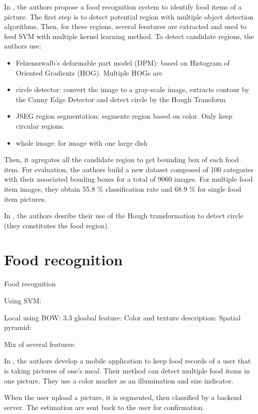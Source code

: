In \cite{Matsuda2012a}, the authors propose a food recognition system to identify food items of a picture. The first step is to detect potential region with multiple object detection algorithms. Then, for these regions, several feeatures are extracted and used to feed SVM with multiple kernel learning method. To detect candidate regions, the authors use:
\begin{itemize}
    \item Felzenszwalb’s deformable part model (DPM): based on Histogram of Oriented Gradients (HOG). Multiple HOGs are
    \item circle detector: convert the image to a gray-scale image, extracts contour by the Canny Edge Detector and detect circle by the Hough Transform
    \item JSEG region segmentation: segmente region based on color. Only keep circular regions.
    \item whole image: for image with one large dish
\end{itemize}
Then, it agregates all the candidate region to get bounding box of each food item.
For evaluation, the authors build a new dataset composed of 100 categories with their associated bouding boxes for a total of 9060 images. For multiple food item images, they obtain 55.8 \% classification rate and 68.9 \% for single food item pictures.

In \cite{Wazumi2011}, the authors desribe their use of the Hough transformation to detect circle (they constitutes the food region).


\section{Food recognition}

Food recognition

Using SVM:

Local using BOW: 3.3
gloabal feature:
Color and texture description: 
Spatial pyramid:

Mix of several features:

In \cite{Zhu2015}, the authors develop a mobile application to keep food records of a user that is taking pictures of one's meal. Their method can detect multiple food items in one picture. They use a color marker as an illumination and size indicator.

When the user upload a picture, it is segmented, then classified by a backend server. The estimation are sent back to the user for confirmation.

